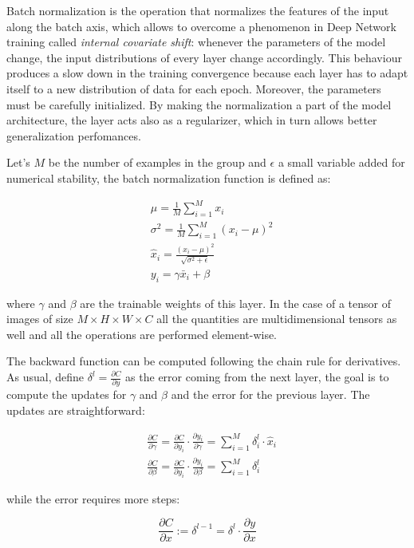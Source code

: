 \documentclass[12pt,a4paper]{report}
\begin{document}
Batch normalization is the operation that normalizes the features of the input along the batch axis, which allows to overcome a phenomenon in Deep Network training called {\it internal covariate shift}: whenever the parameters of the model change, the input distributions of every layer change accordingly.
This behaviour produces a slow down in the training convergence because each layer has to adapt itself to a new distribution of data for each epoch. Moreover, the parameters must be carefully initialized. 
By making the normalization a part of the model architecture, the layer acts also as a regularizer, which in turn allows better generalization perfomances.  

Let's $M$ be the number of examples in the group and $\epsilon$ a small variable added for numerical stability, the batch normalization function is defined as: 

\begin{align}
  &\mu = \frac{1}{M} \sum_{i=1}^{M} x_i \\
  &\sigma^2 = \frac{1}{M} \sum_{i=1}^{M} (x_i - \mu)^2 \\
  &\hat x_i = \frac{(x_i - \mu)^2}{\sqrt{\sigma^2 + \epsilon}} \\
  &y_i = \gamma \bar x_i + \beta
\end{align}

where $\gamma$ and $\beta$ are the trainable weights of this layer. In the case of a tensor of images of size $M \times H \times W \times C$ all the quantities are multidimensional tensors as well and all the operations are performed element-wise.

The backward function can be computed following the chain rule for derivatives. As usual, define $\delta^l = \frac{\partial C}{\partial y}$ as the error coming from the next layer, the goal is to compute the updates for $\gamma$ and $\beta$ and the error for the previous layer. 
The updates are straightforward: 

\begin{align}
 &\frac{\partial C}{\partial \gamma} = \frac{\partial C}{\partial y_i} \cdot \frac{\partial y_i}{\partial \gamma} = \sum_{i=1}^{M} \delta_i^l \cdot \hat x_i \\
 &\frac{\partial C}{\partial \beta} = \frac{\partial C}{\partial y_i} \cdot \frac{\partial y_i}{\partial \beta} = \sum_{i=1}^M \delta_i^l 
\end{align}

while the error requires more steps:

\begin{equation}
 \frac{\partial C}{\partial x} := \delta^{l-1} = \delta^l \cdot \frac{\partial y}{\partial  x}
\end{equation}
\end{document}
